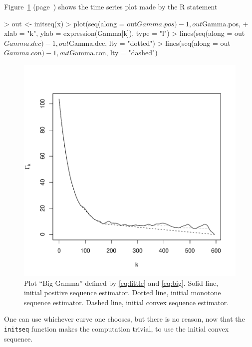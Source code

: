 \documentclass[12pt]{article}
\begin{document}
Figure~\ref{fig:gamma} (page~\pageref{fig:gamma})
shows the time series plot made by the R statement
\begin{Schunk}
\begin{Sinput}
> out <- initseq(x)
> plot(seq(along = out$Gamma.pos) - 1, out$Gamma.pos,
+      xlab = "k", ylab = expression(Gamma[k]), type = "l")
> lines(seq(along = out$Gamma.dec) - 1, out$Gamma.dec, lty = "dotted")
> lines(seq(along = out$Gamma.con) - 1, out$Gamma.con, lty = "dashed")
\end{Sinput}
\end{Schunk}
\begin{figure}
\begin{center}
\includegraphics{sweaveTemplate-figgam}
\end{center}
\caption{Plot ``Big Gamma'' defined by \eqref{eq:little} and \eqref{eq:big}.
         Solid line, initial positive sequence estimator.
         Dotted line, initial monotone sequence estimator.
         Dashed line, initial convex sequence estimator.}
\label{fig:gamma}
\end{figure}
One can use whichever curve one chooses, but there is no reason, now that
the \texttt{initseq} function makes the computation trivial, to use the
initial convex sequence.
\end{document}
